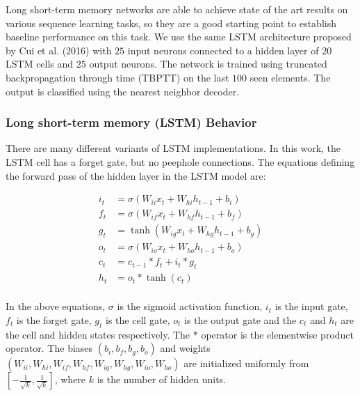 \documentclass{article}
\begin{document}
Long short-term memory \cite{hochreiter1997long} networks are able to achieve state of the art results on various sequence learning tasks, so they are a good starting point to establish baseline performance on this task. We use the same LSTM architecture proposed by Cui et al. (2016) with $25$ input neurons connected to a hidden layer of $20$ LSTM cells and $25$ output neurons. The network is trained using truncated backpropagation through time (TBPTT) \cite{mozer1995focused, sutskever2013training} on the last $100$ seen elements. The output is classified using the nearest neighbor decoder.

\subsubsection*{Long short-term memory (LSTM) Behavior}
There are many different variants of LSTM implementations. In this work, the LSTM cell has a forget gate, but no peephole connections. The equations defining the forward pass of the hidden layer in the LSTM model are:

\begin{align*}
    i_t &= \sigma\left(W_{ii}x_t + W_{hi}h_{t-1} + b_i\right)\\
    f_t &= \sigma\left(W_{if}x_t + W_{hf}h_{t-1} + b_f\right)\\
    g_t &= \tanh\left(W_{ig}x_t + W_{hg}h_{t-1} + b_g\right)\\
    o_t &= \sigma\left(W_{io}x_t + W_{ho}h_{t-1} + b_o\right)\\
    c_t &= c_{t-1}\ast f_t + i_t \ast g_t\\
    h_t &= o_t \ast \tanh\left(c_t\right)\\
\end{align*}

In the above equations, $\sigma$ is the sigmoid activation function, $i_t$ is the input gate, $f_t$ is the forget gate, $g_t$ is the cell gate, $o_t$ is the output gate and the $c_t$ and $h_t$ are the cell and hidden states respectively. The $\ast$ operator is the elementwise product operator. The biases $\left(b_i, b_f, b_g, b_o\right)$ and weights $\left(W_{ii}, W_{hi}, W_{if}, W_{hf}, W_{ig}, W_{hg},W_{io}, W_{ho}\right)$ are initialized uniformly from $\left[-\frac{1}{\sqrt{k}}, \frac{1}{\sqrt{k}}\right]$, where $k$ is the number of hidden units. \cite{jozefowicz2015empirical} 
\end{document}
